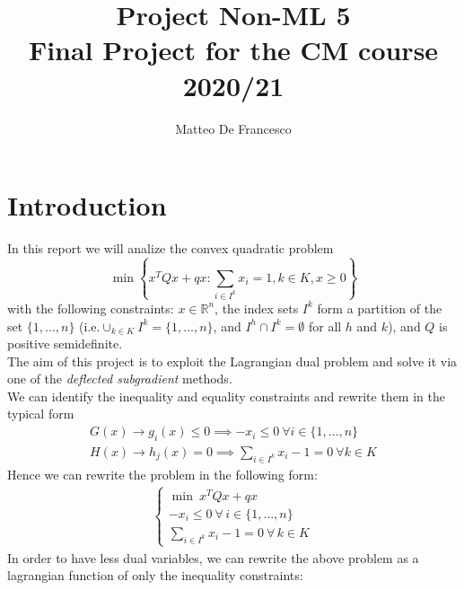 \documentclass[notitlepage]{article}
\title{Project Non-ML 5\\Final Project for the CM course 2020/21}
\author{Matteo De Francesco}
\date{}
\begin{document}
\maketitle

\thispagestyle{empty}

\tableofcontents

\newpage


\section{Introduction}
In this report we will analize the convex quadratic problem
\begin{equation}
    \min \left\lbrace x^T Q x + q x : \sum_{i \in I^k} x_i = 1, k\in K, x \ge 0 \right\rbrace
    \label{eqn:problem} \tag{$P$}
\end{equation}
with the following constraints: $x \in \mathbb{R}^n$, the index sets $I^k$ form a partition of the set $\{1,\ldots,n\}$ (i.e.$ \cup_{k\in K} I^k = \{ 1,\ldots,n \}$, and $I^h \cap I^k = \emptyset $ for all
$h$ and $k$), and $Q$ is positive semidefinite.\\
The aim of this project is to exploit the Lagrangian dual problem and solve it via one of the \textit{deflected subgradient} methods.\\
We can identify the inequality and equality constraints and rewrite them in the typical form
\begin{gather*}
  G(x) \rightarrow g_i(x) \le 0 \implies -x_i \le 0 \ \forall i \in \{1,\ldots,n\} \\
  H(x) \rightarrow h_j(x) = 0 \implies \sum_{i \in I^k} x_i - 1 = 0 \ \forall k \in K
\end{gather*}    
Hence we can rewrite the problem in the following form:
\begin{align*}
  \begin{cases}
    \min\  x^T Q x + q x \\
    -x_i \le 0 \ \forall\, i \in \{1,\ldots,n\} \\
    \sum_{i \in I^k} x_i - 1 = 0 \ \forall\, k \in K
  \end{cases}    
\end{align*}
In order to have less dual variables, we can rewrite the above problem as a lagrangian function of only the inequality constraints:
\end{document}
